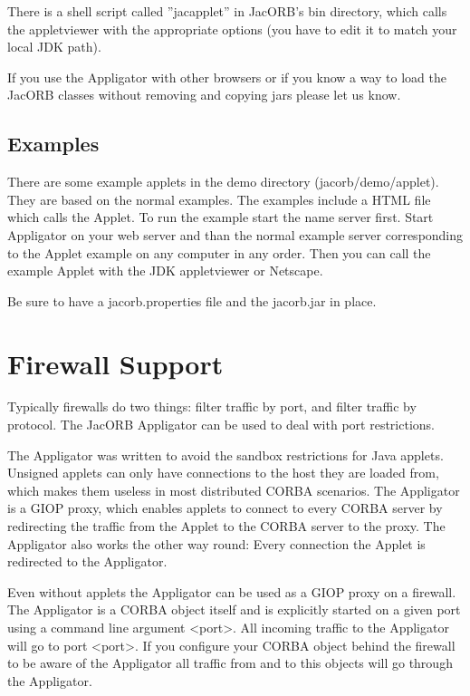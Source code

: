 There is a shell script called ''jacapplet'' in JacORB's bin
directory, which calls the appletviewer with the appropriate options
(you have to edit it to match your local JDK path).

If you use the Appligator with other browsers or if you know a way to
load the JacORB classes without removing and copying jars please let
us know.

\subsection{Examples}

There are some example applets in the demo directory
(jacorb/demo/applet). They are based on the normal examples. The
examples include a HTML file which calls the Applet. To run the
example start the name server first. Start Appligator on your web
server and than the normal example server corresponding to the Applet
example on any computer in any order. Then you can call the example
Applet with the JDK appletviewer or Netscape.

Be sure to have a jacorb.properties file and the jacorb.jar in place.

\section{Firewall Support}

Typically firewalls do two things: filter traffic by port, and filter
traffic by protocol. The JacORB Appligator can be used to deal with
port restrictions.

The Appligator was written to avoid the sandbox restrictions for Java
applets. Unsigned applets can only have connections to the host they
are loaded from, which makes them useless in most distributed CORBA
scenarios. The Appligator is a GIOP proxy, which enables applets to
connect to every CORBA server by redirecting the traffic from the
Applet to the CORBA server to the proxy. The Appligator also works the
other way round: Every connection the Applet is redirected to the
Appligator.

Even without applets the Appligator can be used as a GIOP proxy on a
firewall. The Appligator is a CORBA object itself and is explicitly
started on a given port using a command line argument <port>. All
incoming traffic to the Appligator will go to port <port>. If you
configure your CORBA object behind the firewall to be aware of the
Appligator all traffic from and to this objects will go through the
Appligator.

